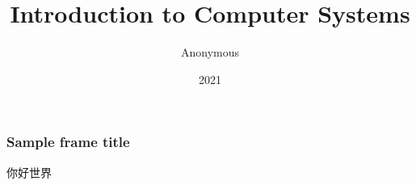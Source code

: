 \documentclass{beamer}
\title{Introduction to Computer Systems}
\author{Anonymous}
\institute{Overleaf}
\date{2021}
\begin{document}
\frame{\titlepage}

\begin{frame}
\frametitle{Sample frame title}
你好世界
\end{frame}
\end{document}
